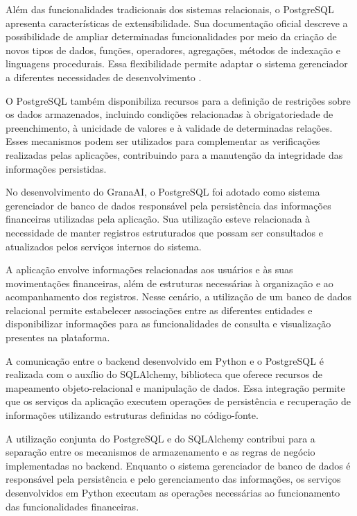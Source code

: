 Além das funcionalidades tradicionais dos sistemas relacionais, o PostgreSQL apresenta características de extensibilidade. Sua documentação oficial descreve a possibilidade de ampliar determinadas funcionalidades por meio da criação de novos tipos de dados, funções, operadores, agregações, métodos de indexação e linguagens procedurais. Essa flexibilidade permite adaptar o sistema gerenciador a diferentes necessidades de desenvolvimento \cite{postgresql_intro_2026}.

O PostgreSQL também disponibiliza recursos para a definição de restrições sobre os dados armazenados, incluindo condições relacionadas à obrigatoriedade de preenchimento, à unicidade de valores e à validade de determinadas relações. Esses mecanismos podem ser utilizados para complementar as verificações realizadas pelas aplicações, contribuindo para a manutenção da integridade das informações persistidas.

No desenvolvimento do GranaAI, o PostgreSQL foi adotado como sistema gerenciador de banco de dados responsável pela persistência das informações financeiras utilizadas pela aplicação. Sua utilização esteve relacionada à necessidade de manter registros estruturados que possam ser consultados e atualizados pelos serviços internos do sistema.

A aplicação envolve informações relacionadas aos usuários e às suas movimentações financeiras, além de estruturas necessárias à organização e ao acompanhamento dos registros. Nesse cenário, a utilização de um banco de dados relacional permite estabelecer associações entre as diferentes entidades e disponibilizar informações para as funcionalidades de consulta e visualização presentes na plataforma.

A comunicação entre o backend desenvolvido em Python e o PostgreSQL é realizada com o auxílio do SQLAlchemy, biblioteca que oferece recursos de mapeamento objeto-relacional e manipulação de dados. Essa integração permite que os serviços da aplicação executem operações de persistência e recuperação de informações utilizando estruturas definidas no código-fonte.

A utilização conjunta do PostgreSQL e do SQLAlchemy contribui para a separação entre os mecanismos de armazenamento e as regras de negócio implementadas no backend. Enquanto o sistema gerenciador de banco de dados é responsável pela persistência e pelo gerenciamento das informações, os serviços desenvolvidos em Python executam as operações necessárias ao funcionamento das funcionalidades financeiras.

